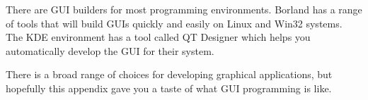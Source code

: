 There are GUI builders for most programming environments.
Borland has a range of tools that will build GUIs quickly 
and easily on Linux and Win32 systems.  The KDE environment 
has a tool called QT Designer which helps you automatically 
develop the GUI for their system.  

There is a broad range
of choices for developing graphical applications, but 
hopefully this appendix gave  you a taste of what GUI programming
is like.

